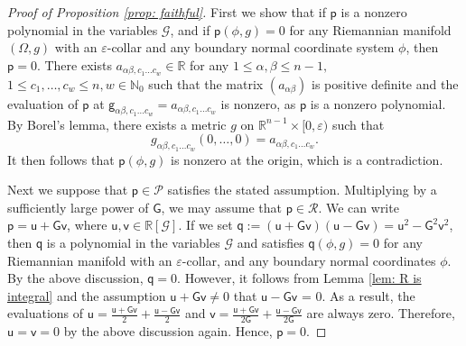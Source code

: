 \documentclass[11pt]{amsart}
\theoremstyle{definition}
\numberwithin{equation}{section}
\begin{document}
\begin{proof}[Proof of Proposition \ref{prop: faithful}]
    First we show that if $\mathsf p$ is a nonzero polynomial in the variables $\mathcal G$, and if $\mathsf p(\phi,g) = 0$ for any Riemannian manifold $(\Omega,g)$ with an $\varepsilon$-collar and any boundary normal coordinate system $\phi$, then $\mathsf p = 0$. There exists $a_{\alpha\beta,c_1\dots c_w}\in\mathbb R$ for any $1\le \alpha,\beta\le n-1,$ $1\le c_1,\dots,c_w\le n,w\in\mathbb N_0$ such that the matrix $(a_{\alpha\beta})$ is positive definite and the evaluation of $\mathsf p$ at $\mathsf g_{\alpha\beta,c_1\dots c_w}= a_{\alpha\beta,c_1\dots c_w}$
    is nonzero, as $\mathsf p$ is a nonzero polynomial. By Borel's lemma, there exists a metric $g$ on $\mathbb R^{n-1}\times [0,\varepsilon)$ such that
    \[g_{\alpha\beta,c_1\dots c_w}(0,\dots,0) = a_{\alpha\beta,c_1\dots c_w}.\]
    It then follows that $\mathsf p(\phi,g)$ is nonzero at the origin, which is a contradiction.

    Next we suppose that $\mathsf p\in\mathcal P$ satisfies the stated assumption. Multiplying by a sufficiently large power of $\mathsf G$, we may assume that $\mathsf p\in\mathcal R$. We can write $\mathsf p = \mathsf u + \mathsf G\mathsf v$, where $\mathsf u,\mathsf v\in\mathbb R[\mathcal G]$. If we set $\mathsf q := (\mathsf u + \mathsf G\mathsf v)(\mathsf u - \mathsf G\mathsf v) = \mathsf u^2 - \mathsf G^2\mathsf v^2$, then $\mathsf q$ is a polynomial in the variables $\mathcal G$ and satisfies $\mathsf q(\phi,g) = 0$ for any Riemannian manifold with an $\varepsilon$-collar, and any boundary normal coordinates $\phi$. By the above discussion, $\mathsf q = 0$. However, it follows from Lemma \ref{lem: R is integral} and the assumption $\mathsf u + \mathsf G\mathsf v\neq0$ that $\mathsf u - \mathsf G\mathsf v$ = 0. As a result, the evaluations of $\mathsf u = \frac{\mathsf u + \mathsf G\mathsf v}{2} + \frac{\mathsf u - \mathsf G\mathsf v}{2}$ and $\mathsf v = \frac{\mathsf u + \mathsf G\mathsf v}{2\mathsf G} + \frac{\mathsf u - \mathsf G\mathsf v}{2\mathsf G}$ are always zero. Therefore, $\mathsf u = \mathsf v = 0$ by the above discussion again. Hence, $\mathsf p = 0$.
\end{proof}
\end{document}
